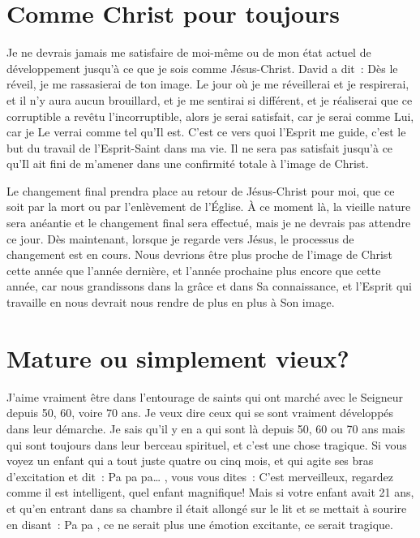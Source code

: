 \section*{Comme Christ pour toujours}

Je ne devrais jamais me satisfaire de moi-même ou de mon état actuel
 de développement jusqu'à ce que je sois comme Jésus-Christ.
 David a dit~:
 \og Dès le réveil, je me rassasierai de ton image. \fg{}
 Le jour où je me réveillerai et je respirerai,
 et il n'y aura aucun brouillard, et je me sentirai si différent,
 et je réaliserai que ce corruptible a revêtu l'incorruptible,
 alors je serai satisfait, car je serai comme Lui, car je Le verrai
 comme tel qu'Il est. C'est ce vers quoi l'Esprit me guide,
 c'est le but du travail de l'Esprit-Saint dans ma vie.
 Il ne sera pas satisfait jusqu'à ce qu'Il ait fini de m'amener
 dans une confirmité totale à l'image de Christ.

Le changement final prendra place au retour de Jésus-Christ pour moi,
 que ce soit par la mort ou par l'enlèvement de l'Église.
 À ce moment là, la vieille nature sera anéantie et le changement final
 sera effectué, mais je ne devrais pas attendre ce jour.
 Dès maintenant, lorsque je regarde vers Jésus, le processus de changement
 est en cours. Nous devrions être plus proche de l'image de Christ
 cette année que l'année dernière, et l'année prochaine plus encore
 que cette année, car nous grandissons dans la grâce et dans Sa connaissance,
 et l'Esprit qui travaille en nous devrait nous rendre
 de plus en plus à Son image.


\section*{Mature ou simplement vieux?}

J'aime vraiment être dans l'entourage de saints
 qui ont marché avec le Seigneur depuis 50, 60, voire 70 ans.
 Je veux dire ceux qui se sont vraiment développés dans leur démarche.
 Je sais qu'il y en a qui sont là depuis 50, 60 ou 70 ans mais qui sont
 toujours dans leur berceau spirituel, et c'est une chose tragique.
 Si vous voyez un enfant qui a tout juste quatre ou cinq mois,
 et qui agite ses bras d'excitation et dit~:
 \og Pa pa pa\dots{} \fg{}, vous vous dites~:
 \og C'est merveilleux, regardez comme il est intelligent,
 quel enfant magnifique! \fg{} 
 Mais si votre enfant avait 21 ans, et qu'en entrant dans sa chambre
 il était allongé sur le lit et se mettait à sourire en disant~:
 \og Pa pa \fg{}, ce ne serait plus une émotion excitante,
 ce serait tragique.

